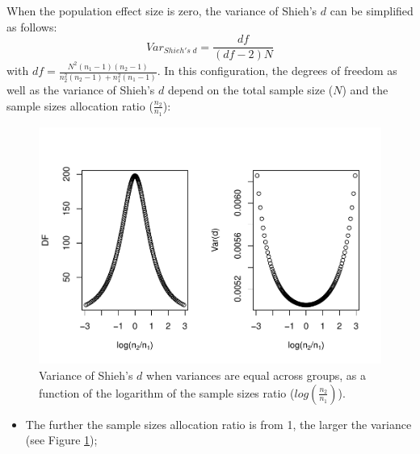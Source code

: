 \documentclass[
  english,
  man,mask]{apa6}
\providecommand{\tightlist}{%
  \setlength{\itemsep}{0pt}\setlength{\parskip}{0pt}}
\begin{document}
When the population effect size is zero, the variance of Shieh's \(d\) can be simplified as follows:
\[Var_{Shieh's \; d} = \frac{df}{(df-2)N}\]
with \(df = \frac{N^2(n_1-1)(n_2-1)}{n_2^2(n_2-1)+n_1^2(n_1-1)}\). In this configuration, the degrees of freedom as well as the variance of Shieh's \(d\) depend on the total sample size (\(N\)) and the sample sizes allocation ratio (\(\frac{n_2}{n_1}\)):

\begin{figure}
\centering
\includegraphics{Theoretical-Variance-of-all-estimators-as-a-function-of-population-parameters_files/figure-latex/varshiehHomNratio2-1.pdf}
\caption{\label{fig:varshiehHomNratio2}Variance of Shieh's \(d\) when variances are equal across groups, as a function of the logarithm of the sample sizes ratio (\(log\left(\frac{n_2}{n_1} \right)\)).}
\end{figure}

\begin{itemize}
\tightlist
\item
  The further the sample sizes allocation ratio is from 1, the larger the variance (see Figure \ref{fig:varshiehHomNratio2});
\end{itemize}
\end{document}
